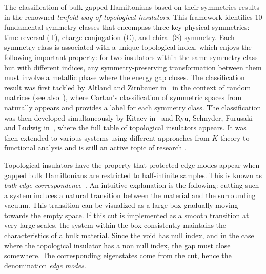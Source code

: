 \documentclass[11pt]{amsart}
\numberwithin{equation}{section} %
\newcommand\1{{\mathds 1}}
\begin{document}
The classification of bulk gapped Hamiltonians based on their symmetries results in the renowned {\em tenfold way of topological insulators}. This framework identifies 10 fundamental symmetry classes that encompass three key physical symmetries: time-reversal (T), charge conjugation (C), and chiral (S) symmetry. Each symmetry class is associated with a unique topological index, which enjoys the following important property: for two insulators within the same symmetry class but with different indices, any symmetry-preserving transformation between them must involve a metallic phase where the energy gap closes. The classification result was first tackled by Altland and Zirnbauer in~\cite{AltZir-97} in the context of random matrices (see also~\cite{HeiHucZir-05}), where Cartan's classification of symmetric spaces from~\cite{Car-26, Car-27} naturally appears and provides a label for each symmetry class. The classification was then developed simultaneously by Kitaev in~\cite{Kit-09} and Ryu, Schnyder, Furusaki and Ludwig in~\cite{RyuSchFur-10}, where the full table of topological insulators appears. It was then extended to various systems using different approaches from $K$-theory to functional analysis and is still an active topic of research \cite{FreMor-13,ProSch-16,Thi-16,BouCarAla-16,GroSch-16,KatKom-18,AllMaxZir-20,AvrTur-22,GonMonPer-22,ChuSha-23}.

\medskip

Topological insulators have the property that protected edge modes appear when gapped bulk Hamiltonians are restricted to half-infinite samples. This is known as {\em bulk-edge correspondence}~\cite{Hal-82, Hat-93, Hat-93a}. An intuitive explanation is the following: cutting such a system induces a natural transition between the material and the surrounding vacuum. This transition can be visualized as a large box gradually moving towards the empty space. If this cut is implemented as a smooth transition at very large scales, the system within the box consistently maintains the characteristics of a bulk material. Since the void has null index, and in the case where the topological insulator has a non null index, the gap must close somewhere. The corresponding eigenstates come from the cut, hence the denomination {\em edge modes}. 

\medskip
\end{document}
